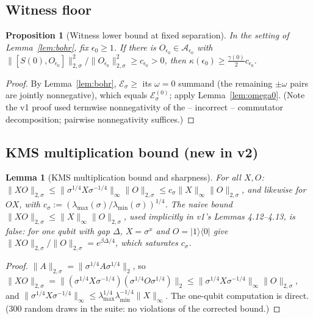 \documentclass[11pt]{article}
\newtheorem{lemma}[theorem]{Lemma}
\newtheorem{proposition}[theorem]{Proposition}
\theoremstyle{remark}
\newcommand{\kms}[1]{\|#1\|_{2,\sigma}}
\begin{document}
\subsection{Witness floor}
\begin{proposition}[Witness lower bound at fixed separation]
\label{prop:witness}
In the setting of Lemma~\ref{lem:bohr}, fix $\epsilon_0 \ge 1$. If there is
$O_{\epsilon_0} \in \mathcal{A}_{\epsilon_0}$ with
$\kms{[S(0), O_{\epsilon_0}]}^2 / \kms{O_{\epsilon_0}}^2 \ge c_{\epsilon_0}
> 0$, then $\kappa(\epsilon_0) \ge \tfrac{\gamma(0)}{2} c_{\epsilon_0}$.
\end{proposition}
\begin{proof}
By Lemma~\ref{lem:bohr}, $\mathcal{E}_\sigma \ge$ its $\omega = 0$ summand
(the remaining $\pm\omega$ pairs are jointly nonnegative), which equals
$\mathcal{E}^{(0)}_\sigma$; apply Lemma~\ref{lem:omega0}. (Note the v1
proof used termwise nonnegativity of the -- incorrect -- commutator
decomposition; pairwise nonnegativity suffices.)
\end{proof}

\subsection{KMS multiplication bound (new in v2)}
\begin{lemma}[KMS multiplication bound and sharpness]
\label{lem:mult}
For all $X, O$: $\kms{XO} \le \|\sigma^{1/4} X \sigma^{-1/4}\|_\infty
\kms{O} \le c_\sigma \|X\|_\infty \kms{O}$, and likewise for $OX$, with
$c_\sigma := (\lambda_{\max}(\sigma)/\lambda_{\min}(\sigma))^{1/4}$. The
naive bound $\kms{XO} \le \|X\|_\infty \kms{O}$, used implicitly in v1's
Lemmas 4.12--4.13, is false: for one qubit with gap $\Delta$,
$X = \sigma^x$ and $O = |1\rangle\langle 0|$ give $\kms{XO}/\kms{O} =
e^{\beta\Delta/4}$, which saturates $c_\sigma$.
\end{lemma}
\begin{proof}
$\kms{A} = \|\sigma^{1/4} A \sigma^{1/4}\|_2$, so $\kms{XO} =
\|(\sigma^{1/4}X\sigma^{-1/4})(\sigma^{1/4}O\sigma^{1/4})\|_2 \le
\|\sigma^{1/4}X\sigma^{-1/4}\|_\infty \kms{O}$, and
$\|\sigma^{1/4}X\sigma^{-1/4}\|_\infty \le \lambda_{\max}^{1/4}
\lambda_{\min}^{-1/4}\|X\|_\infty$. The one-qubit computation is direct.
(300 random draws in the suite: no violations of the corrected bound.)
\end{proof}
\end{document}
